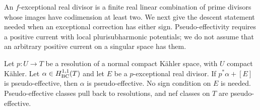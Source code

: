 An $f$-exceptional real divisor is a finite real linear combination of
prime divisors whose images have codimension at least two.
We next give the descent statement needed when an exceptional
correction has either sign.  Pseudo-effectivity requires a positive
current with local plurisubharmonic potentials; we do not assume
that an arbitrary positive current on a singular space has them.

\begin{lemma}\label{lem:positive-descent}
Let $p:U\to T$ be a resolution of a normal compact K\"ahler space,
with $U$ compact K\"ahler.  Let $\alpha\in H^{1,1}_{\mathrm{BC}}(T)$ and let $E$ be a
$p$-exceptional real divisor.  If $p^*\alpha+[E]$ is pseudo-effective,
then $\alpha$ is pseudo-effective.  No sign condition on $E$ is needed.
Pseudo-effective classes pull back to resolutions, and nef classes
on $T$ are pseudo-effective.
\end{lemma}

